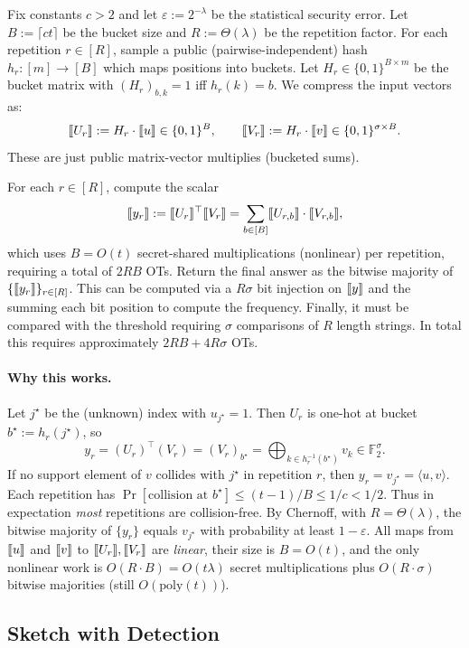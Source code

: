 Fix constants $c>2$ and let $\varepsilon:=2^{-\lambda}$ be the statistical security error.
Let $B:=\lceil ct\rceil$ be the bucket size  and $R:=\Theta(\lambda)$ be the repetition factor. For each repetition $r\in[R]$, sample a public (pairwise-independent) hash
$h_r:[m]\to[B]$ which maps positions into buckets. Let $H_r\in\{0,1\}^{B\times m}$ be the bucket matrix with $(H_r)_{b,k}=1$ iff $h_r(k)=b$. We compress the input vectors as:
\[
\share{U_r} :=  H_r\cdot\share{u} \in\{0,1\}^B,
\qquad
\share{V_r} := H_r\cdot\share{v} \in \{0,1\}^{\sigma\times B}.
\]
These are just public matrix-vector multiplies (bucketed sums).

For each $r\in [R]$, compute the scalar
\[
\share{y_r} :=\share{U_r}^\top \share{V_r} = \sum_{b\in[B]} \share{U_{r,b}} \cdot \share{V_{r,b}},
\]
which uses $B=O(t)$ secret-shared multiplications (nonlinear) per repetition, requiring a total of $2RB$ OTs. Return the final answer as the bitwise majority of $\{\share{y_r}\}_{r\in [R]}$. This can be computed via a $R\sigma$ bit injection on $\share{y}$ and the summing each bit position to compute the frequency. Finally, it must be compared with the threshold requiring $\sigma$ comparisons of $R$ length strings. In total this requires approximately $2RB+4R\sigma$ OTs.

\paragraph{Why this works.}
Let $j^\star$ be the (unknown) index with $u_{j^\star}=1$. Then $U_r$ is one-hot at bucket $b^\star:=h_r(j^\star)$, so
\[
    y_r = (U_r)^\top (V_r) = (V_r)_{b^\star}
    = \bigoplus_{k\in h_r^{-1}(b^\star)} v_k \in \mathbb{F}_2^\sigma.
\]
If no support element of $v$ collides with $j^\star$ in repetition $r$, then $y_r=v_{j^\star}=\langle u,v\rangle$. Each repetition has
\(
    \Pr[\text{collision at }b^\star]\le (t-1)/B \le 1/c < 1/2.
\)
Thus in expectation \emph{most} repetitions are collision-free. By Chernoff, with $R=\Theta(\lambda)$, the bitwise majority of $\{y_r\}$ equals $v_{j^\star}$ with probability at least $1-\varepsilon$. All maps from $\share{u}$ and $\share{v}$ to $\share{U_r},\share{V_r}$ are \emph{linear}, their size is $B=O(t)$, and the only nonlinear work is $O(R\cdot B)=O(t\lambda)$ secret multiplications
plus $O(R\cdot \sigma)$ bitwise majorities (still $O(\mathrm{poly}(t))$).


\subsection{Sketch with Detection}

